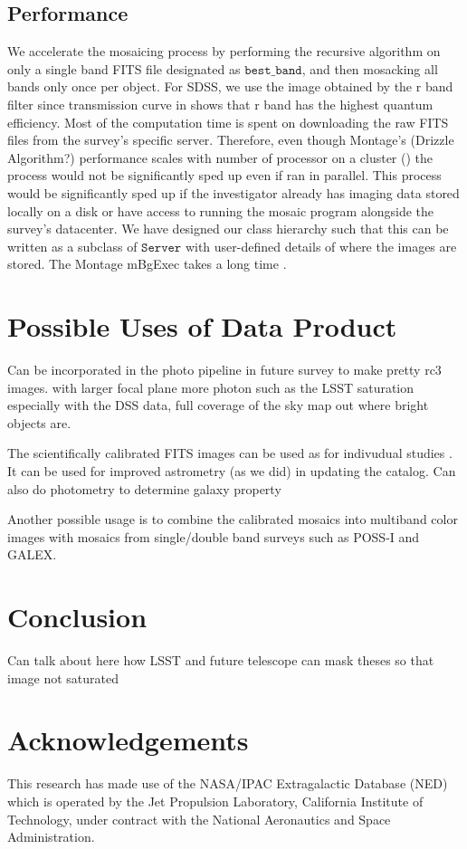 \documentclass[5p]{elsarticle}
\begin{document}
	\subsection{Performance}	We accelerate the mosaicing process by performing the recursive algorithm on only a single band FITS file designated as $\texttt{best\_band}$, and then mosacking all bands only once per object. For SDSS, we use the image obtained by the r band filter since transmission curve in \citet{edr} shows that r band has the highest quantum efficiency.  Most of the computation time is spent on downloading the raw FITS files from the survey's specific server. Therefore, even though Montage's (Drizzle Algorithm?) performance scales with number of processor on a cluster (\citet{montage}) the process would not be significantly sped up even if ran in parallel. This process would be significantly sped up if the investigator already has imaging data stored locally on a disk or have access to running the mosaic program alongside the survey's datacenter. We have designed our class hierarchy such that this can be written as a subclass of $\texttt{Server}$ with user-defined details of where the images are stored.
The Montage 	mBgExec takes a long time . 

\section{Possible Uses of Data Product}
Can be incorporated in the photo pipeline in future survey to make pretty rc3 images.
with larger focal plane 
more photon
such as the LSST
saturation
especially with the DSS data, full coverage of the sky
map out where bright objects are. 


The scientifically calibrated FITS images can be used as for indivudual studies . It can be used for improved astrometry (as we did) in updating the catalog. Can also do photometry to determine galaxy property

Another possible usage is to combine the calibrated mosaics into multiband color images with mosaics from single/double band surveys such as POSS-I and GALEX.

 \section{Conclusion}
Can talk about here how LSST and future telescope can mask theses so that image not saturated
\section{Acknowledgements}
This research has made use of the NASA/IPAC Extragalactic Database (NED) which is operated by the Jet Propulsion Laboratory, California Institute of Technology, under contract with the National Aeronautics and Space Administration.
\end{document}
